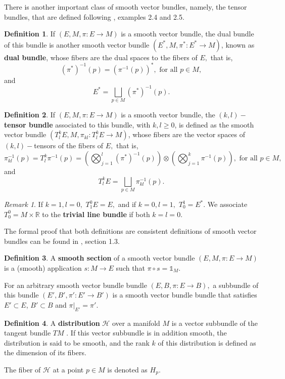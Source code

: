 \documentclass[12pt, letterpaper, reqno]{amsart}
\theoremstyle{definition}
\newtheorem{df}{Definition}
\theoremstyle{plain}
\theoremstyle{remark}
\newtheorem{rem}{Remark}
\begin{document}
There is another important class of smooth vector bundles, namely, the tensor bundles, that are defined following \cite{wendl2008lecture}, examples 2.4 and 2.5.
\begin{df} 
	If $ (E,M,\pi:E \rightarrow {M}) $ is a smooth vector bundle, the dual bundle of this bundle is another smooth vector bundle $ (E^*,M,\pi^*:E^*\rightarrow {M}) $, known as \textbf{ dual bundle}, whose fibers are the dual spaces to the fibers of $ E, $ that is,
	$$ (\pi^{*})^{-1}(p)=(\pi^{-1}(p))^*, \text{ for all }p\in M,$$ 
	and $$ E^* =\bigsqcup_{p\in M} (\pi^*)^{-1}(p). $$ 
\end{df}
\begin{df}
	If $ (E,M,\pi:E \rightarrow {M}) $ is a smooth vector bundle, the \textbf{$ (k,l)- $tensor bundle} associated to this bundle, with $ k,l\geq0 $, is defined as the smooth vector bundle $ (T^k_l E, M, \pi_{kl}: T^k_l E \rightarrow {M}) $, whose fibers are the vector spaces of $ (k,l) -$tensors of the fibers of $ E, $ that is,     
	$$ \pi_{kl}^{-1}(p) = T^k_l \pi^{-1}(p)=\left( \bigotimes_{j=1}^l (\pi^{*})^{-1}(p)\right)\otimes \left( \bigotimes_{j=1}^k \pi^{-1}(p) \right), \text{ for all }p\in M, $$ 
	and
	$$ T^k_l E = \bigsqcup_{p\in M} \pi_{kl}^{-1}(p). $$ 
\end{df}
\begin{rem}
	If $ k=1,l=0, $ $T^0_1E=E,$ and if $ k=0,l=1, $ $ T^1_0=E^*. $ We associate $ T^0_0=M\times \mathbb{R} $ to the \textbf{trivial line bundle} if both $ k=l=0. $ 
\end{rem}

The formal proof that both definitions are consistent definitions of smooth vector bundles can be found in \cite{luke2013vector}, section 1.3.
\begin{df}
	A \textbf{smooth section} of a smooth vector bundle $ (E,M,\pi:E \rightarrow {M}) $ is a (smooth) application $ s: M \rightarrow {E} $ such that $ \pi\circ s= \mathbb{1}_{M}. $    
\end{df}
For an arbitrary smooth vector bundle bundle $ (E,B,\pi:E \rightarrow {B}), $ a subbundle of this bundle $ (E',B',\pi':E' \rightarrow {B'}) $  is a smooth vector bundle bundle that satisfies $ E'\subset E $, $ B'\subset B $ and $ \pi|_{E'}=\pi'. $
\begin{df}
	
	A \textbf{distribution} $ \mathcal{H} $ over a manifold $ M $  is a vector subbundle of the tangent bundle $ TM $ . If this vector subbundle is in addition smooth, the distribution is said to be smooth, and the rank $ k $  of this distribution is defined as the dimension of its fibers.

	The fiber of $ \mathcal{H} $ at a point $ p\in M $ is denoted as $ H_p. $ 
\end{df}
\end{document}
